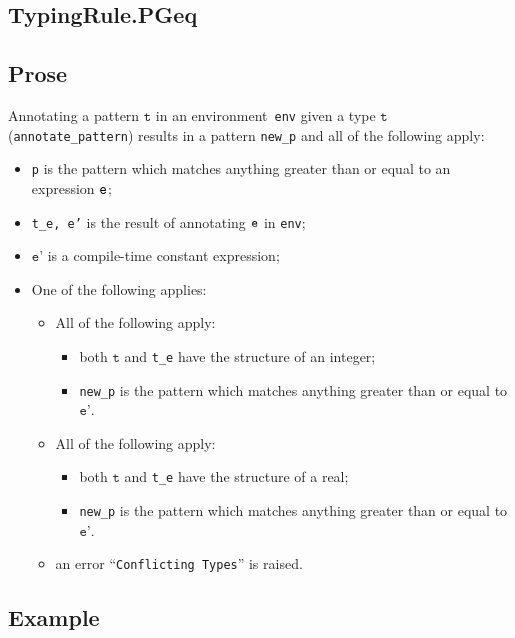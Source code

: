 \documentclass{book}
\newcommand\vt[0]{\texttt{t}}
\newcommand\vep[0]{\texttt{e'}}
\begin{document}
\begin{itemize}
\section{TypingRule.PGeq \label{sec:TypingRule.PGeq}}

  \subsection{Prose}
   Annotating a pattern $\vt$ in an environment~\texttt{env} given a type $\vt$ (\texttt{annotate\_pattern}) results in a pattern \texttt{new\_p} and all of the following apply:
   \begin{itemize}
   \item \texttt{p} is the pattern which matches anything greater than or equal to an expression $\texttt{e}$;
   \item \texttt{t\_e, e'} is the result of annotating $\texttt{e}$ in \texttt{env};
   \item $\vep$ is a compile-time constant expression;
   \item One of the following applies:
     \begin{itemize}
     \item All of the following apply:
           \begin{itemize}
           \item both $\vt$ and \texttt{t\_e} have the structure of an integer;
           \item \texttt{new\_p} is the pattern which matches anything greater than or equal to $\vep$.
           \end{itemize}
     \item All of the following apply:
           \begin{itemize}
           \item both $\vt$ and \texttt{t\_e} have the structure of a real;
           \item \texttt{new\_p} is the pattern which matches anything greater than or equal to $\vep$.
           \end{itemize}
     \item an error ``\texttt{Conflicting Types}'' is raised.
     \end{itemize}
   \end{itemize}

  \subsection{Example}



\end{itemize}
\end{document}
